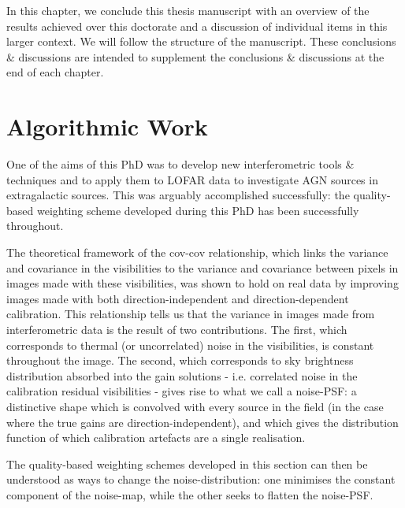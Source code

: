 \pg
In this chapter, we conclude this thesis manuscript with an overview of the results achieved over this doctorate and a discussion of individual items in this larger context. We will follow the structure of the manuscript. These conclusions \& discussions are intended to supplement the conclusions \& discussions at the end of each chapter.




\section{Algorithmic Work}

\pg
One of the aims of this PhD was to develop new interferometric tools \& techniques and to apply them to LOFAR data to investigate AGN sources in extragalactic sources. This was arguably accomplished successfully: the quality-based weighting scheme developed during this PhD has been successfully throughout.

\pg
The theoretical framework of the cov-cov relationship, which links the variance and covariance in the visibilities to the variance and covariance between pixels in images made with these visibilities, was shown to hold on real data by improving images made with both direction-independent and direction-dependent calibration. This relationship tells us that the variance in images made from interferometric data is the result of two contributions. The first, which corresponds to thermal (or uncorrelated) noise in the visibilities, is constant throughout the image. The second, which corresponds to sky brightness distribution absorbed into the gain solutions - i.e. correlated noise in the calibration residual visibilities - gives rise to what we call a noise-PSF: a distinctive shape which is convolved with every source in the field (in the case where the true gains are direction-independent), and which gives the distribution function of which calibration artefacts are a single realisation.

\pg
The quality-based weighting schemes developed in this section can then be understood as ways to change the noise-distribution: one minimises the constant component of the noise-map, while the other seeks to flatten the noise-PSF. 



